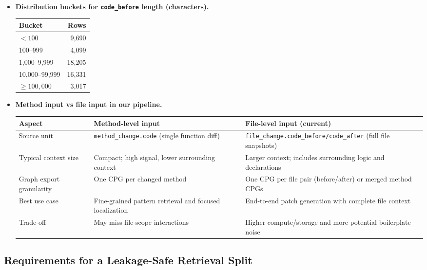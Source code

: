 \documentclass[11pt, a4paper]{article}
\begin{document}
\begin{itemize}[leftmargin=*]
  \item \textbf{Distribution buckets for \texttt{code\_before} length (characters).}
  \begin{center}
  \small
  \renewcommand{\arraystretch}{1.2}
  \begin{tabular}{lr}
    \toprule
    \textbf{Bucket} & \textbf{Rows} \\
    \midrule
    $<100$ & 9,690 \\
    100--999 & 4,099 \\
    1,000--9,999 & 18,205 \\
    10,000--99,999 & 16,331 \\
    $\geq 100,000$ & 3,017 \\
    \bottomrule
  \end{tabular}
  \end{center}

  \item \textbf{Method input vs file input in our pipeline.}
  \begin{center}
  \small
  \renewcommand{\arraystretch}{1.2}
  \begin{tabular}{p{3.2cm}p{5.5cm}p{5.5cm}}
    \toprule
    \textbf{Aspect} & \textbf{Method-level input} & \textbf{File-level input (current)} \\
    \midrule
    Source unit & \texttt{method\_change.code} (single function diff) & \texttt{file\_change.code\_before/code\_after} (full file snapshots) \\
    Typical context size & Compact; high signal, lower surrounding context & Larger context; includes surrounding logic and declarations \\
    Graph export granularity & One CPG per changed method & One CPG per file pair (before/after) or merged method CPGs \\
    Best use case & Fine-grained pattern retrieval and focused localization & End-to-end patch generation with complete file context \\
    Trade-off & May miss file-scope interactions & Higher compute/storage and more potential boilerplate noise \\
    \bottomrule
  \end{tabular}
  \end{center}
\end{itemize}

\subsection*{Requirements for a Leakage-Safe Retrieval Split}
\end{document}
